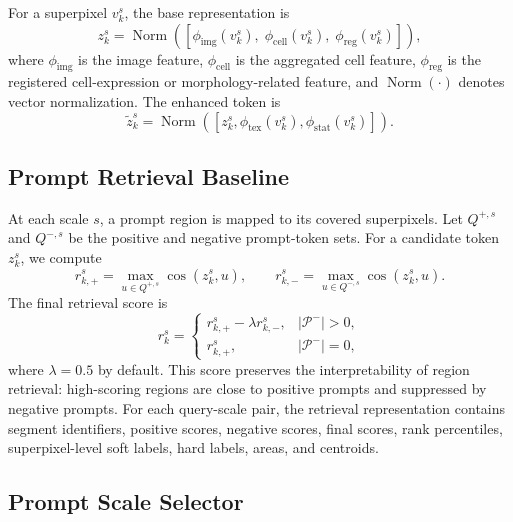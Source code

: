 \documentclass[letterpaper]{article} %
\begin{document}
For a superpixel $v_k^s$, the base representation is
\begin{equation}
    z_k^s =
    \operatorname{Norm}
    \left(
    [\phi_{\mathrm{img}}(v_k^s),\;
    \phi_{\mathrm{cell}}(v_k^s),\;
    \phi_{\mathrm{reg}}(v_k^s)]
    \right),
\end{equation}
where $\phi_{\mathrm{img}}$ is the image feature, $\phi_{\mathrm{cell}}$ is the aggregated cell feature, $\phi_{\mathrm{reg}}$ is the registered cell-expression or morphology-related feature, and $\operatorname{Norm}(\cdot)$ denotes vector normalization. The enhanced token is
\begin{equation}
    \tilde{z}_k^s =
    \operatorname{Norm}
    \left(
    [z_k^s,\phi_{\mathrm{tex}}(v_k^s),\phi_{\mathrm{stat}}(v_k^s)]
    \right).
\end{equation}

\subsection{Prompt Retrieval Baseline}

At each scale $s$, a prompt region is mapped to its covered superpixels. Let $Q^{+,s}$ and $Q^{-,s}$ be the positive and negative prompt-token sets. For a candidate token $z_k^s$, we compute
\begin{equation}
    r_{k,+}^{s}=\max_{u\in Q^{+,s}}\cos(z_k^s,u),
    \qquad
    r_{k,-}^{s}=\max_{u\in Q^{-,s}}\cos(z_k^s,u).
\end{equation}
The final retrieval score is
\begin{equation}
    r_k^{s}=
    \begin{cases}
    r_{k,+}^{s}-\lambda r_{k,-}^{s}, & |\mathcal{P}^{-}|>0,\\
    r_{k,+}^{s}, & |\mathcal{P}^{-}|=0,
    \end{cases}
\end{equation}
where $\lambda=0.5$ by default. This score preserves the interpretability of region retrieval: high-scoring regions are close to positive prompts and suppressed by negative prompts. For each query-scale pair, the retrieval representation contains segment identifiers, positive scores, negative scores, final scores, rank percentiles, superpixel-level soft labels, hard labels, areas, and centroids.

\subsection{Prompt Scale Selector}
\end{document}
